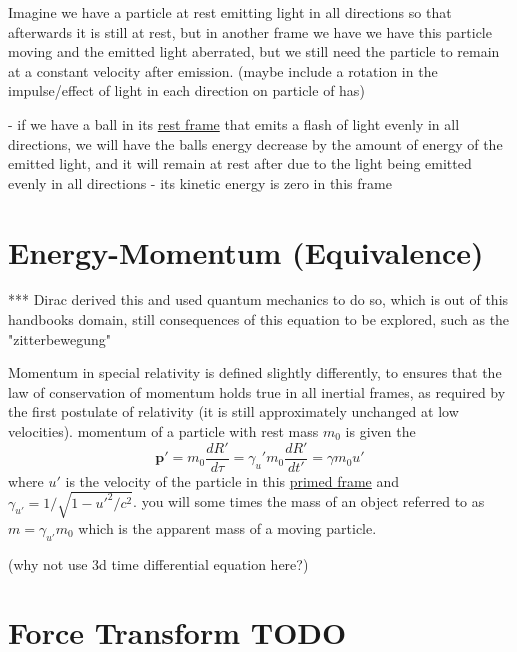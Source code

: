 Imagine we have a particle at rest emitting light in all directions so that afterwards it is still at rest, but in another frame we have we have this particle moving and the emitted light aberrated, but we still need the particle to remain at a constant velocity after emission. (maybe include a rotation in the impulse/effect of light in each direction on particle of has)


- if we have a ball in its \hyperlink{def-proper-frame}{rest frame} that emits a flash of light evenly in all directions, we will have the balls energy decrease by the amount of energy of the emitted light, and it will remain at rest after due to the light being emitted evenly in all directions
- its kinetic energy is zero in this frame

\section{Energy-Momentum (Equivalence)}

*** Dirac derived this and used quantum mechanics to do so, which is out of this handbooks domain, still consequences of this equation to be explored, such as the "zitterbewegung"

Momentum in special relativity is defined slightly differently, to ensures that the law of conservation of momentum holds true in all inertial frames, as required by the first postulate of relativity (it is still approximately unchanged at low velocities). momentum of a particle with rest mass $m_0$ is given the
\begin{equation}%
	\mathbf{p'} = m_0 \frac{dR'}{d\tau}= \gamma_u' m_0 \frac{dR'}{dt'} = \gamma m_0 u'
\end{equation}%
where $u'$ is the velocity of the particle in this \hyperlink{def-Primed-Frame}{primed frame} and $\gamma_{u'}= 1/\sqrt{1-u'^2/c^2}$. you will some times the mass of an object referred to as $m=\gamma_{u'} m_0$ which is the apparent mass of a moving particle.

(why not use 3d time differential equation here?)

\section{Force Transform TODO}

